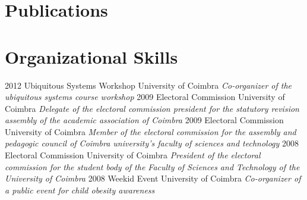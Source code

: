 \documentclass[]{friggeri-cv} %
\begin{document}
\section{Publications}

\begin{refsection} %
\nocite{*}
\printbibliography[sorting=chronological, type=inproceedings, title={international peer-reviewed conferences/proceedings}, notkeyword={france}, heading=subbibliography]
\end{refsection}


\vfill\eject


\section{Organizational Skills}

\begin{entrylist}
\entry
{2012}
{Ubiquitous Systems Workshop}
{University of Coimbra}
{\emph{Co-organizer of the ubiquitous systems course workshop}}
\entry
{2009}
{Electoral Commission}
{University of Coimbra}
{\emph{Delegate of the electoral commission president for the statutory revision assembly of the academic association of Coimbra}}
\entry
{2009}
{Electoral Commission}
{University of Coimbra}
{\emph{Member of the electoral commission for the assembly and pedagogic council of Coimbra university's faculty of sciences and technology}}
\entry
{2008}
{Electoral Commission}
{University of Coimbra}
{\emph{President of the electoral commission for the student body of the Faculty of Sciences and Technology of the University of Coimbra}}
\entry
{2008}
{Weekid Event}
{University of Coimbra}
{\emph{Co-organizer of a public event for child obesity awareness}}
\end{entrylist}
\end{document}
